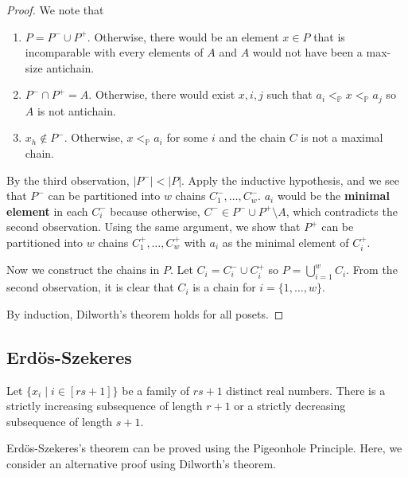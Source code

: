 \begin{proof}
    We note that
    \begin{enumerate}
        \item $P = P^- \cup P^+$. Otherwise, there would be an element $x \in P$ that is incomparable with every elements of $A$ and $A$ would not have been a max-size antichain.
        \item $P^- \cap P^+ = A$. Otherwise, there would exist $x,i,j$ such that $a_i <_{\mathbb{P}} x <_{\mathbb{P}} a_j$ so $A$ is not antichain.
        \item $x_h \not\in P^-$. Otherwise, $x <_{\mathbb{P}} a_i$ for some $i$ and the chain $C$ is not a maximal chain.
    \end{enumerate}

    By the third observation, $|P^-| < |P|$. Apply the inductive hypothesis, and we see that $P^-$ can be partitioned into $w$ chains $C^-_1,\ldots, C^-_w$. $a_i$ would be the \textbf{minimal element} in each $C^-_i$ because otherwise, $C^- \in P^- \cup P^+ \setminus A$, which contradicts the second observation. Using the same argument, we show that $P^+$ can be partitioned into $w$ chains $C^+_1,\ldots,C^+_w$ with $a_i$ as the minimal element of $C^+_i$.

    Now we construct the chains in $P$. Let $C_i = C^-_i \cup C^+_i$ so $P = \bigcup_{i=1}^w C_i$. From the second observation, it is clear that $C_i$ is a chain for $i = \{1,\ldots,w\}$.

    By induction, Dilworth's theorem holds for all posets.
\end{proof}

\subsection{Erd\"os-Szekeres}

\begin{theorem}
    Let $\{x_i \mid i \in [rs + 1]\}$ be a family of $rs + 1$ distinct real numbers. There is a strictly increasing subsequence of length $r+1$ or a strictly decreasing subsequence of length $s+1$.
\end{theorem}

Erd\"os-Szekeres's theorem can be proved using the Pigeonhole Principle. Here, we consider an alternative proof using Dilworth's theorem.

